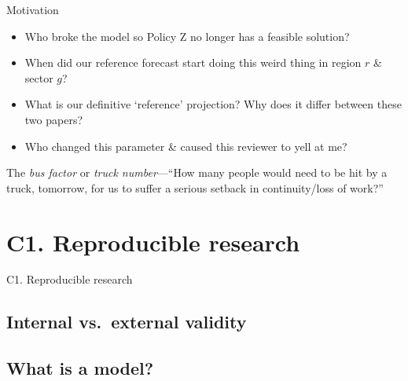 \documentclass[12pt,aspectratio=169]{beamer}
\begin{document}
\begin{frame}{Motivation}

\begin{itemize}
  \item Who broke the model so Policy Z no longer has a feasible solution?
  \item When did our reference forecast start doing this weird thing in region $r$ \& sector $g$?
  \item What is our definitive ‘reference’ projection?
    Why does it differ between these two papers?
  \item Who changed this parameter \& caused this reviewer to yell at me?
\end{itemize}

\bigskip
{}

The \emph{bus factor} or \emph{truck number}—“How many people would need to be hit by a truck, tomorrow, for us to suffer a serious setback in continuity/loss of work?”

\end{frame}

\section{C1. Reproducible research}
\begin{frame}{C1. Reproducible research}
\tableofcontents[hideothersubsections]
\end{frame}

\subsection{Internal vs.\ external validity}


\subsection{What is a model?}

\end{document}
